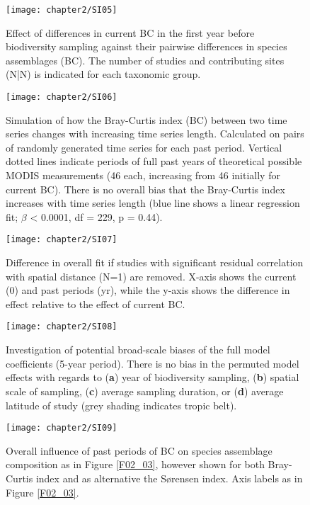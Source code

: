 

\begin{figure}[htb]
\centering
\texttt{[image: chapter2/SI05]}
\caption{ Effect of differences in current BC in the first year before biodiversity sampling against their pairwise differences in species assemblages (BC). The number of studies and contributing sites (N|N) is indicated for each taxonomic group. }
\label{SI02_05}
\end{figure}

\begin{figure}[htb]
\centering
\texttt{[image: chapter2/SI06]}
\caption{ Simulation of how the Bray-Curtis index (BC) between two time series changes with increasing time series length. Calculated on pairs of randomly generated time series for each past period. Vertical dotted lines indicate periods of full past years of theoretical possible MODIS measurements (46 each, increasing from 46 initially for current BC). There is no overall bias that the Bray-Curtis index increases with time series length (blue line shows a linear regression fit; $\beta$ < 0.0001, df = 229, p = 0.44).}
\label{SI02_06}
\end{figure}

\begin{figure}[htb]
\centering
\texttt{[image: chapter2/SI07]}
\caption{ Difference in overall fit if studies with significant residual correlation with spatial distance (N=1) are removed. X-axis shows the current (0) and past periods (yr), while the y-axis shows the difference in effect relative to the effect of current BC.}
\label{SI02_07}
\end{figure}

\begin{figure}[htb]
\centering
\texttt{[image: chapter2/SI08]}
\caption{ Investigation of potential broad-scale biases of the full model coefficients (5-year period). There is no bias in the permuted model effects with regards to (\textbf{a}) year of biodiversity sampling, (\textbf{b}) spatial scale of sampling, (\textbf{c}) average sampling duration, or (\textbf{d}) average latitude of study (grey shading indicates tropic belt).}
\label{SI02_08}
\end{figure}

\begin{figure}[htb]
\centering
\texttt{[image: chapter2/SI09]}
\caption{ Overall influence of past periods of BC on species assemblage composition as in Figure \ref{F02_03}, however shown for both Bray-Curtis index and as alternative the S\o rensen index. Axis labels as in Figure \ref{F02_03}.}
\label{SI02_09}
\end{figure}
